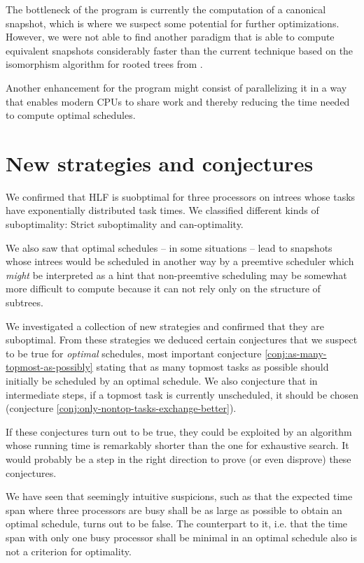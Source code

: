 The bottleneck of the program is currently the computation of a canonical snapshot, which is where we suspect some potential for further optimizations. However, we were not able to find another paradigm that is able to compute equivalent snapshots considerably faster than the current technique based on the isomorphism algorithm for rooted trees from \cite{aho1974design}.

Another enhancement for the program might consist of parallelizing it in a way that enables modern CPUs to share work and thereby reducing the time needed to compute optimal schedules.

\section{New strategies and conjectures}
\label{sec:conclusion-strategies}

We confirmed that HLF is suobptimal for three processors on intrees whose tasks have exponentially distributed task times. We classified different kinds of suboptimality: Strict suboptimality and can-optimality.

We also saw that optimal schedules -- in some situations -- lead to snapshots whose intrees would be scheduled in another way by a preemtive scheduler which \emph{might} be interpreted as a hint that non-preemtive scheduling may be somewhat more difficult to compute because it can not rely only on the structure of subtrees.

We investigated a collection of new strategies and confirmed that they are suboptimal. From these strategies we deduced certain conjectures that we suspect to be true for \emph{optimal} schedules, most important conjecture \ref{conj:as-many-topmost-as-possibly} stating that as many topmost tasks as possible should initially be scheduled by an optimal schedule. We also conjecture that in intermediate steps, if a topmost task is currently unscheduled, it should be chosen (conjecture \ref{conj:only-nontop-tasks-exchange-better}).

If these conjectures turn out to be true, they could be exploited by an algorithm whose running time is remarkably shorter than the one for exhaustive search. It would probably be a step in the right direction to prove (or even disprove) these conjectures. 

We have seen that seemingly intuitive suspicions, such as that the expected time span where three processors are busy shall be as large as possible to obtain an optimal schedule, turns out to be false. The counterpart to it, i.e. that the time span with only one busy processor shall be minimal in an optimal schedule also is not a criterion for optimality.

